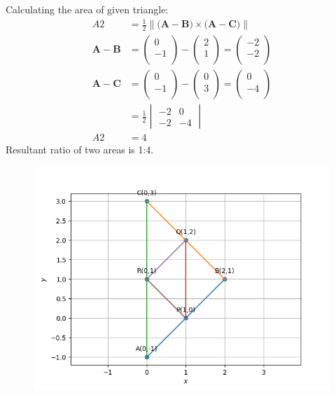 \documentclass[12pt]{article}
\newcommand{\mydet}[1]{\ensuremath{\begin{vmatrix}#1\end{vmatrix}}}
\providecommand{\norm}[1]{\left\lVert#1\right\rVert}
\newcommand{\myvec}[1]{\ensuremath{\begin{pmatrix}#1\end{pmatrix}}}
\let\vec\mathbf
\begin{document}
Calculating the area of given triangle:
	\begin{align}
	A2&=\frac{1}{2}{\norm{\vec(\vec{A}-\vec{B})\times\vec(\vec{A}-\vec{C})}}\\
		\vec{A}-\vec{B} &=  \myvec{
  0 \\
  -1 \\
 } - \myvec{
  2 \\
  1 \\
 } = \myvec{
 -2 \\
 -2 \\
 }
 \\
		\vec{A}-\vec{C} &=  \myvec{
  0 \\
  -1 \\
 } - \myvec{
  0 \\
  3 \\
 } = \myvec{
 0 \\
 -4 \\
 }
 \\
		&=\frac{1}{2}\mydet{-2 & 0\\-2 & -4}\\
                A2&=4
	\end{align}
	Resultant ratio of two areas is 1:4.
\begin{figure}[!h]
	\begin{center} 
	    \includegraphics[width=\columnwidth]{./figs/trigraph.png}
	\end{center}
\caption{}
\label{fig:Fig}
\end{figure}
\end{document}
